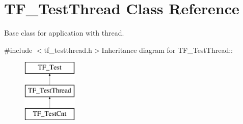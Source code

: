 \hypertarget{classTF__TestThread}{
\section{TF\_\-TestThread Class Reference}
\label{classTF__TestThread}
}


Base class for application with thread.  


{\ttfamily \#include $<$tf\_\-testthread.h$>$}Inheritance diagram for TF\_\-TestThread::\begin{figure}[H]
\begin{center}
\leavevmode
\includegraphics[height=3cm]{classTF__TestThread}
\end{center}
\end{figure}
